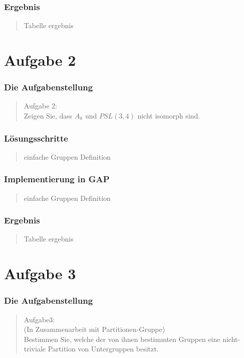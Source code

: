\documentclass{beamer}
\begin{document}
\begin{frame}
	\frametitle{Ergebnis}
	\begin{quote}
	 Tabelle ergebnis
		 
	\end{quote}
\end{frame}



\section{Aufgabe 2}

\begin{frame}
	\frametitle{Die Aufgabenstellung}
	\begin{quote}
	Aufgabe 2:\\
	Zeigen Sie, dass $A_8$ und $ PSL(3,4)$ nicht isomorph sind.
		 
	\end{quote}
\end{frame}

\begin{frame}
	\frametitle{Lösungsschritte}
	\begin{quote}
	 einfache Gruppen Definition
		 
	\end{quote}
\end{frame}

\begin{frame}
	\frametitle{Implementierung in GAP}
	\begin{quote}
	 einfache Gruppen Definition
		 
	\end{quote}
\end{frame}

\begin{frame}
	\frametitle{Ergebnis}
	\begin{quote}
	 Tabelle ergebnis
		 
	\end{quote}
\end{frame}


\section{Aufgabe 3}

\begin{frame}
	\frametitle{Die Aufgabenstellung}
	\begin{quote}
	Aufgabe3:\\
	(In Zusammenarbeit mit Partitionen-Gruppe)\\
	Bestimmen Sie, welche der von ihnen bestimmten Gruppen eine nicht-triviale Partition von Untergruppen besitzt.

	\end{quote}
\end{frame}
\end{document}
